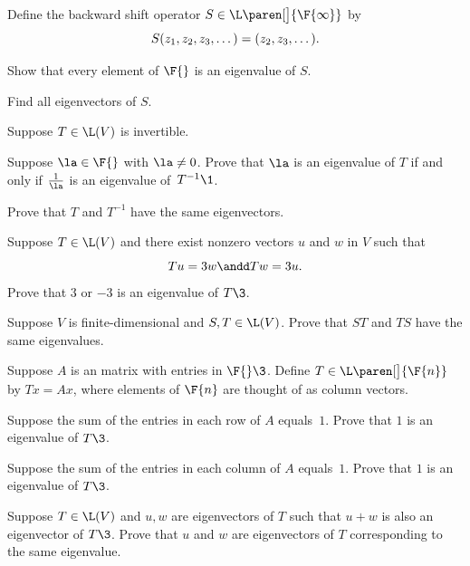 \exercise
Define the backward shift operator $S \in \L\paren[\big]{\F{\infty}}$ by
\[ \addtolength{\belowdisplayskip}{-3bp}
S(z_1, z_2, z_3, \dots) = (z_2, z_3, \dots).
\]
\begin{subtheorem}
\item
Show that every element of $\F{}$ is an eigenvalue of $S$.
\item
Find all eigenvectors of $S$.
\end{subtheorem}
\exercisesubtheoremend


\exercise
Suppose $T \in \L(V)$ is invertible.
\begin{subtheorem}
\item
Suppose $\la \in \F{}$ with $\la \ne 0$. Prove that $\la$ is an eigenvalue of $T$ if and only if $\frac{1}{\la}$ is an eigenvalue of~$T^{-1}\1$.
\item
Prove that $T$ and $T^{-1}$ have the same eigenvectors.
\end{subtheorem}
\exercisesubtheoremend


\exercise
Suppose $T \in \L(V)$ and there exist nonzero vectors $u$ and $w$ in $V$ such that
\[
Tu = 3w \andd Tw = 3u.
\]
Prove that $3$ or $-3$ is an eigenvalue of $T\3$.


\exercise
Suppose $V$ is finite-dimensional and $S, T \in \L(V)$.  Prove that $ST$ and $TS$ have the same eigenvalues.

\exercise
Suppose $A$ is an  matrix with entries in $\F{}\3$. Define $T \in \L\paren[\big]{\F{n}}$ by $Tx = Ax$, where elements of $\F{n}$ are thought of as  column vectors.
\begin{subtheorem}
\item
Suppose the sum of the entries in each row of $A$ equals~$1$.
Prove that $1$ is an eigenvalue of $T\3$.
\item
Suppose the sum of the entries in each column of $A$ equals~$1$.
Prove that $1$ is an eigenvalue of $T\3$.
\end{subtheorem}
\exercisesubtheoremend


\exercise
Suppose $T \in \L(V)$ and $u, w$ are eigenvectors of $T$ such that $u+w$ is also an eigenvector of $T\3$. Prove that $u$ and $w$ are eigenvectors of $T$ corresponding to the same eigenvalue.


